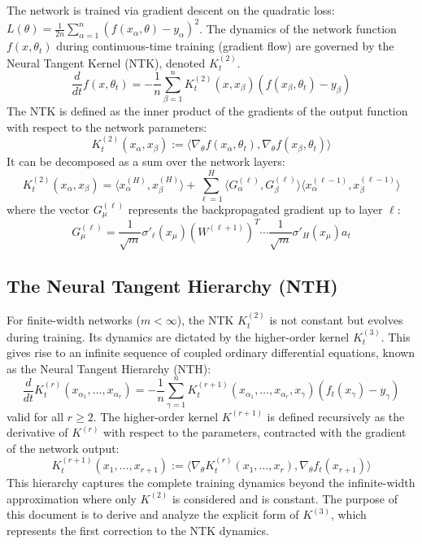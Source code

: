 \documentclass[a4paper]{article}
\begin{document}
The network is trained via gradient descent on the quadratic loss: $L(\theta) = \frac{1}{2n}\sum_{\alpha=1}^n (f(x_\alpha, \theta) - y_\alpha)^2$. The dynamics of the network function $f(x, \theta_t)$ during continuous-time training (gradient flow) are governed by the Neural Tangent Kernel (NTK), denoted $K^{(2)}_t$.
\begin{equation}
\frac{d}{dt} f(x, \theta_t) = -\frac{1}{n}\sum_{\beta=1}^n K^{(2)}_t(x, x_\beta) (f(x_\beta, \theta_t) - y_\beta)
\end{equation}
The NTK is defined as the inner product of the gradients of the output function with respect to the network parameters:
\begin{equation}
K^{(2)}_t(x_\alpha, x_\beta) := \langle \nabla_\theta f(x_\alpha, \theta_t), \nabla_\theta f(x_\beta, \theta_t) \rangle
\end{equation}
It can be decomposed as a sum over the network layers:
\begin{equation}
K^{(2)}_t(x_\alpha, x_\beta) = \langle x^{(H)}_\alpha, x^{(H)}_\beta \rangle + \sum_{\ell=1}^{H} \langle G^{(\ell)}_\alpha, G^{(\ell)}_\beta \rangle \langle x^{(\ell-1)}_\alpha, x^{(\ell-1)}_\beta \rangle
\end{equation}
where the vector $G^{(\ell)}_\mu$ represents the backpropagated gradient up to layer $\ell$:
\begin{equation}
G^{(\ell)}_\mu = \frac{1}{\sqrt{m}}\sigma'_\ell(x_\mu) (W^{(\ell+1)})^T \cdots \frac{1}{\sqrt{m}}\sigma'_H(x_\mu) a_t
\end{equation}

\subsection{The Neural Tangent Hierarchy (NTH)}
For finite-width networks ($m < \infty$), the NTK $K^{(2)}_t$ is not constant but evolves during training. Its dynamics are dictated by the higher-order kernel $K^{(3)}_t$. This gives rise to an infinite sequence of coupled ordinary differential equations, known as the Neural Tangent Hierarchy (NTH):
\begin{equation}
\frac{d}{dt} K^{(r)}_t(x_{\alpha_1}, \dots, x_{\alpha_r}) = -\frac{1}{n} \sum_{\gamma=1}^n K^{(r+1)}_t(x_{\alpha_1}, \dots, x_{\alpha_r}, x_\gamma) (f_t(x_\gamma) - y_\gamma)
\end{equation}
valid for all $r \ge 2$. The higher-order kernel $K^{(r+1)}$ is defined recursively as the derivative of $K^{(r)}$ with respect to the parameters, contracted with the gradient of the network output:
\begin{equation}
K^{(r+1)}_t(x_1, \dots, x_{r+1}) := \langle \nabla_\theta K^{(r)}_t(x_1, \dots, x_r), \nabla_\theta f_t(x_{r+1}) \rangle
\end{equation}
This hierarchy captures the complete training dynamics beyond the infinite-width approximation where only $K^{(2)}$ is considered and is constant. The purpose of this document is to derive and analyze the explicit form of $K^{(3)}$, which represents the first correction to the NTK dynamics.
\end{document}
